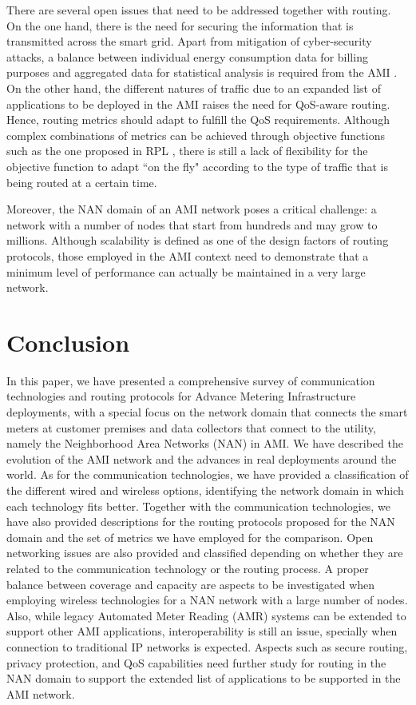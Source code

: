 \documentclass[11pt,draftclsnofoot,onecolumn]{IEEEtran}
\begin{document}
There are several open issues that need to be addressed together with routing. On the one hand, there is the need for securing the information that is transmitted across the smart grid. Apart from mitigation of cyber-security attacks, a balance between individual energy consumption data for billing purposes and aggregated data for statistical analysis is required from the AMI \cite{Saputro2012}. On the other hand, the different natures of traffic due to an expanded list of applications to be deployed in the AMI raises the need for QoS-aware routing. Hence, routing metrics should adapt to fulfill the QoS requirements. Although complex combinations of metrics can be achieved through objective functions such as the one proposed in RPL  \cite{Dohler2009}, there is still a lack of flexibility for the objective function to adapt ``on the fly" according to the type of traffic that is being routed at a certain time. 

Moreover, the NAN domain of an AMI network poses a critical challenge: a network with a number of nodes that start from hundreds and may grow to millions. Although scalability is defined as one of the design factors of routing protocols, those employed in the AMI context need to demonstrate that a minimum level of performance can actually be maintained in a very large network.


\section{Conclusion}\label{conclusion}

In this paper, we have presented a comprehensive survey of communication technologies and routing protocols for Advance Metering Infrastructure deployments, with a special focus on the network domain that connects the smart meters at customer premises and data collectors that connect to the utility, namely the Neighborhood Area Networks (NAN) in AMI. We have described the evolution of the AMI network and the advances in real deployments around the world. As for the communication technologies, we have provided a classification of the different wired and wireless options, identifying the network domain in which each technology fits better. Together with the communication technologies, we have also provided descriptions for the routing protocols proposed for the NAN domain and the set of metrics we have employed for the comparison. Open networking issues are also provided and classified depending on whether they are related to the communication technology or the routing process. A proper balance between coverage and capacity are aspects to be investigated when employing wireless technologies for a NAN network with a large number of nodes. Also, while legacy Automated Meter Reading (AMR) systems can be extended to support other AMI applications, interoperability is still an issue, specially when connection to traditional IP networks is expected. Aspects such as secure routing, privacy protection, and QoS capabilities need further study for routing in the NAN domain to support the extended list of applications to be supported in the AMI network. 
\end{document}

